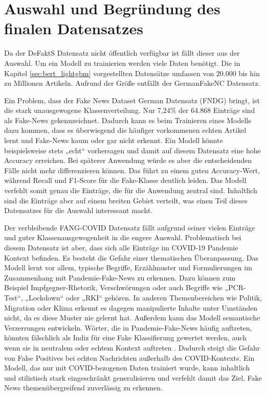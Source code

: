 \section{Auswahl und Begründung des finalen Datensatzes}
\label{sec:auswahl_und_begruendung_finaler_datensatz}

Da der DeFaktS Datensatz nicht öffentlich verfügbar ist fällt dieser aus der Auswahl. 
Um ein Modell zu trainierien werden viele Daten benötigt. Die in Kapitel \ref{sec:bert_lightgbm} vorgestellten Datensätze umfassen von 20.000 bis hin zu Millionen Artikeln.
Aufrund der Größe entfällt der GermanFakeNC Datensatz.

Ein Problem, dass der Fake News Dataset German Datensatz (FNDG) bringt, ist die stark unausgewogene Klassenverteilung. Nur 7,24\% der 64.868 Einträge sind 
als Fake-News gekennzeichnet. Dadurch kann es beim Trainieren eines Modells dazu kommen, dass es überwiegend die häufiger vorkommenen echten Artikel 
lernt und Fake-News kaum oder gar nicht erkennt. 
Ein Modell könnte beispielsweise stets „echt“ vorhersagen und damit auf diesem Datensatz eine hohe Accuracy erreichen.
Bei späterer Anwendung würde es aber die entscheidenden Fälle nicht mehr differenzieren können. 
Das führt zu einem guten Accuracy-Wert, während Recall und F1-Score für die Fake-Klasse deutlich leiden. 
Das Modell verfehlt somit genau die Einträge, die für die Anwendung zentral sind.
Inhaltlich sind die Einträge aber auf einem breiten Gebiet verteilt, was einen Teil dieses Datensatzes für die Auswahl interessant macht.

Der verbleibende FANG-COVID Datensatz \cite{mattern-etal-2021-fang} fällt aufgrund seiner vielen Einträge und guter Klassenausgewogenheit
in die engere Auswahl. Problematisch bei diesem Datensatz ist aber, dass sich alle Einträge im COVID-19 Pandemie Kontext befinden.
Es besteht die Gefahr einer thematischen Überanpassung. Das Modell lernt vor allem, typische Begriffe, Erzählmuster und 
Formulierungen im Zusammenhang mit Pandemie-Fake-News zu erkennen. Dazu können zum Beispiel Impfgegner-Rhetorik, Verschwörungen oder auch Begriffe 
wie „PCR-Test“, „Lockdown“ oder „RKI“ gehören. In anderen Themenbereichen wie Politik, Migration oder Klima erkennt es dagegen manipulierte Inhalte 
unter Umständen nicht, da es diese Muster nie gelernt hat.
Außerdem kann das Modell semantische Verzerrungen entwickeln. Wörter, die in Pandemie-Fake-News häufig auftreten, könnten fälschlich als 
Indiz für eine Fake Klassifierung gewertet werden, auch wenn sie in neutralem oder echtem Kontext auftreten \cite{chen2023, nan2022improvingfakenewsdetection}. 
Dadurch steigt die Gefahr von False Positives bei echten Nachrichten außerhalb des COVID-Kontexts.
Ein Modell, das nur mit COVID-bezogenen Daten trainiert wurde, kann inhaltlich und stilistisch stark eingeschränkt generalisieren und 
verfehlt damit das Ziel, Fake News themenübergreifend zuverlässig zu erkennen.

